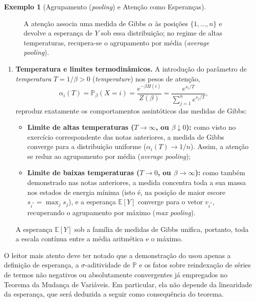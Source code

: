 \documentclass[12pt,portuguese]{article}
\theoremstyle{definition}
\newtheorem{example}[example]{Exemplo}
\begin{document}
\begin{example}[Agrupamento (\emph{pooling}) e Atenção como Esperanças]
\begin{figure}[H]
\caption{A atenção associa uma medida de Gibbs $\alpha$ às posições $\{1,\ldots,n\}$ e
devolve a esperança de $Y$ sob essa distribuição; no regime de altas temperaturas,
recupera-se o agrupamento por média (\emph{average pooling}).}
\label{fig:atencao-esperanca}
\end{figure}

\begin{enumerate}[resume]
\item \textbf{Temperatura e limites termodinâmicos.} A introdução do parâmetro
de \emph{temperatura} $T=1/\beta>0$ (\emph{temperature}) nos pesos de atenção,
\[
\alpha_i(T)
=
\mathbb{P}_\beta(X=i)
=
\frac{e^{-\beta H(i)}}{Z(\beta)}
=
\frac{e^{s_i/T}}{\sum_{j=1}^{n}e^{s_j/T}},
\]
reproduz exatamente os comportamentos assintóticos das medidas de Gibbs:
\begin{itemize}
\item \textbf{Limite de altas temperaturas ($T\to\infty$, ou $\beta\downarrow 0$):}
como visto no exercício correspondente das notas anteriores, a medida de Gibbs
converge para a distribuição uniforme ($\alpha_i(T)\to 1/n$). Assim, a atenção se
reduz ao agrupamento por média (\emph{average pooling});
\item \textbf{Limite de baixas temperaturas ($T\to 0$, ou $\beta\to\infty$):}
como também demonstrado nas notas anteriores, a medida concentra toda a sua massa
nos estados de energia mínima (isto é, na posição de maior escore
$s_{i^*}=\max_j s_j$), e a esperança $\mathbb{E}[Y]$ converge para o vetor
$v_{i^*}$, recuperando o agrupamento por máximo (\emph{max pooling}).
\end{itemize}
A esperança $\mathbb{E}[Y]$ sob a família de medidas de Gibbs unifica, portanto,
toda a escala contínua entre a média aritmética e o máximo.
\end{enumerate}

\end{example}

O leitor mais atento deve ter notado que a demonstração do  
usou apenas a definição de esperança, a $\sigma$-aditividade
de $\mathbb{P}$ e os fatos sobre reindexação de séries de termos não negativos
ou absolutamente convergentes já empregados no Teorema da Mudança de
Variáveis. Em particular, ela não depende da linearidade da esperança, que
será deduzida a seguir como consequência do teorema.
\end{document}
